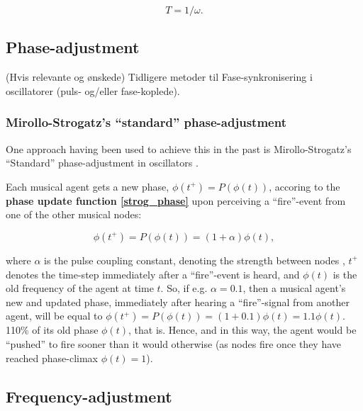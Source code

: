 	\begin{equation}
	\label{period_freq}
		T = 1/\omega .
	\end{equation}
	
	\subsection{Phase-adjustment}
	
	
	(Hvis relevante og ønskede) \nl
	Tidligere metoder til Fase-synkronisering i oscillatorer (puls- og/eller fase-koplede).
	
	\subsubsection{Mirollo-Strogatz's ``standard'' phase-adjustment} %
	\label{mirollo_strogatz_phase_adjust}
	
	One approach having been used to achieve this in the past is Mirollo-Strogatz's ``Standard'' phase-adjustment in oscillators \cite{mirollo_strogatz_PCO_synch}.
	
	Each musical agent gets a new phase, $\phi(t^+) = P(\phi(t))$, accoring to the \textbf{phase update function \eqref{strog_phase}} upon perceiving a ``fire''-event from one of the other musical nodes:
	
	\begin{equation}
	\label{strog_phase}
		\phi(t^+) = P(\phi(t)) = (1 + \alpha)\phi(t)	,
	\end{equation}
	
	where $\alpha$ is the pulse coupling constant, denoting the strength between nodes \cite{nymoen_synch}, $t^+$ denotes the time-step immediately after a ``fire''-event is heard, and $\phi(t)$ is the old frequency of the agent at time $t$. So, if e.g. $\alpha = 0.1$, then a musical agent's new and updated phase, immediately after hearing a ``fire''-signal from another agent, will be equal to $\phi(t^+) = P(\phi(t)) = (1 + 0.1)\phi(t) = 1.1\phi(t)$. 110\% of its old phase $\phi(t)$, that is. Hence, and in this way, the agent would be ``pushed'' to fire sooner than it would otherwise (as nodes fire once they have reached phase-climax $\phi(t)=1$).

	
	
	
	\subsection{Frequency-adjustment}
	

